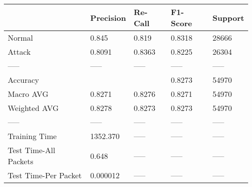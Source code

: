 \begin{tabular}{lllll}
\toprule
{} & Precision & Re-Call & F1-Score & Support \\
\midrule
Normal                &     0.845 &   0.819 &   0.8318 &   28666 \\
Attack                &    0.8091 &  0.8363 &   0.8225 &   26304 \\
-----                 &     ----- &   ----- &    ----- &   ----- \\
Accuracy              &           &         &   0.8273 &   54970 \\
Macro AVG             &    0.8271 &  0.8276 &   0.8271 &   54970 \\
Weighted AVG          &    0.8278 &  0.8273 &   0.8273 &   54970 \\
-----                 &     ----- &   ----- &    ----- &   ----- \\
Training Time         &  1352.370 &   ----- &    ----- &   ----- \\
Test Time-All Packets &     0.648 &   ----- &    ----- &   ----- \\
Test Time-Per Packet  &  0.000012 &   ----- &    ----- &   ----- \\
\bottomrule
\end{tabular}
